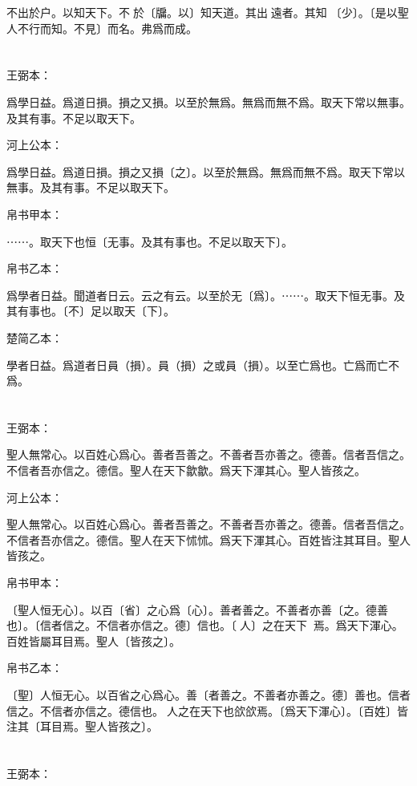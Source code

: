 \documentclass[a5paper]{ctexbook}
\begin{document}
    不出於户。以知天下。不𧠹於〔牖。以〕知天道。其出󱁁遠者。其知󱁁〔少〕。〔是以聖人不行而知。不見〕而名。弗爲而成。

    \chapter{}
    王弼本：

    爲學日益。爲道日損。損之又損。以至於無爲。無爲而無不爲。取天下常以無事。及其有事。不足以取天下。

    河上公本：

    爲學日益。爲道日損。損之又損〔之〕。以至於無爲。無爲而無不爲。取天下常以無事。及其有事。不足以取天下。

    帛书甲本：

    ⋯⋯。取天下也恒〔无事。及其有事也。不足以取天下〕。

    帛书乙本：

    爲學者日益。聞道者日云。云之有云。以至於无〔爲〕。⋯⋯。取天下恒无事。及其有事也。〔不〕足以取天〔下〕。

    楚简乙本：

    學者日益。爲道者日員（損）。員（損）之或員（損）。以至亡爲也。亡爲而亡不爲。

    \chapter{}
    王弼本：

    聖人無常心。以百姓心爲心。善者吾善之。不善者吾亦善之。德善。信者吾信之。不信者吾亦信之。德信。聖人在天下歙歙。爲天下渾其心。聖人皆孩之。

    河上公本：

    聖人無常心。以百姓心爲心。善者吾善之。不善者吾亦善之。德善。信者吾信之。不信者吾亦信之。德信。聖人在天下怵怵。爲天下渾其心。百姓皆注其耳目。聖人皆孩之。

    帛书甲本：

    〔聖人恒无心〕。以百〔省〕之心爲〔心〕。善者善之。不善者亦善〔之。德善也〕。〔信者信之。不信者亦信之。德〕信也。〔𦔻人〕之在天下𢡁𢡁焉。爲天下渾心。百姓皆屬耳目焉。聖人〔皆孩之〕。

    帛书乙本：

    〔聖〕人恒无心。以百省之心爲心。善〔者善之。不善者亦善之。德〕善也。信者信之。不信者亦信之。德信也。𦔻人之在天下也欱欱焉。〔爲天下渾心〕。〔百姓〕皆注其〔耳目焉。聖人皆孩之〕。

    \chapter{}
    王弼本：
\end{document}

